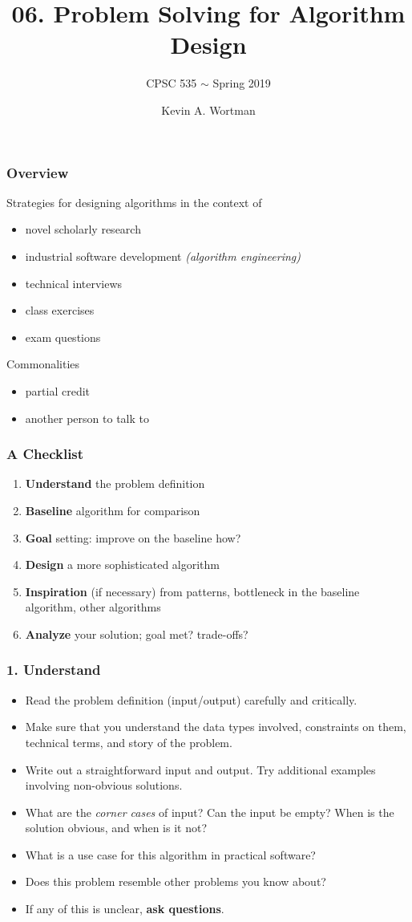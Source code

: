\documentclass{beamer}
\title{06. Problem Solving for Algorithm Design}
\subtitle{CPSC 535 $\sim$ Spring 2019}
\author{Kevin A. Wortman}
\institute{ \texttt{[image: csuf-logo-cmyk]} }
\date{March 4, 2019 \stanza

\texttt{[image: by]} \\

{\tiny
This work is licensed under a
\href{http://creativecommons.org/licenses/by/4.0/}{Creative Commons Attribution 4.0 International License}.
}}
\begin{document}
\begin{frame}
  \titlepage
\end{frame}

\begin{frame} \frametitle{Overview}
Strategies for designing algorithms in the context of
\begin{itemize}
  \item novel scholarly research
  \item industrial software development \emph{(algorithm engineering)}
  \item technical interviews
  \item class exercises
  \item exam questions
\end{itemize}

Commonalities
\begin{itemize}
  \item partial credit
  \item another person to talk to
\end{itemize}
\end{frame}

\begin{frame} \frametitle{A Checklist}
  \begin{enumerate}
    \item \textbf{Understand} the problem definition
    \item \textbf{Baseline} algorithm for comparison
    \item \textbf{Goal} setting: improve on the baseline how?
    \item \textbf{Design} a more sophisticated algorithm
    \item \textbf{Inspiration} (if necessary) from patterns, bottleneck in the
      baseline algorithm, other algorithms
    \item \textbf{Analyze} your solution; goal met? trade-offs?
  \end{enumerate}
\end{frame}

\begin{frame} \frametitle{1. Understand}
  \begin{itemize}
    \item Read the problem definition (input/output) carefully and critically.
    \item Make sure that you understand the data types involved, constraints on them,
      technical terms, and story of the problem.
      \item Write out a straightforward input and output. Try additional examples
        involving non-obvious solutions.
    \item What are the \emph{corner cases} of input? Can the input be empty?
      When is the solution obvious, and when is it not?
    \item What is a use case for this algorithm in practical software?
    \item Does this problem resemble other problems you know about?
    \item If any of this is unclear, \textbf{ask questions}.
  \end{itemize}
\end{frame}
\end{document}
